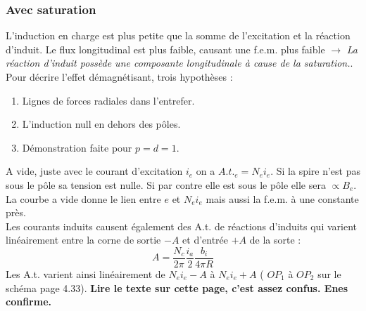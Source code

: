		\subsubsection{Avec saturation}
		L'induction en charge est plus petite que la somme de l'excitation 
		et la réaction d'induit. Le flux longitudinal est plus faible, 
		causant une f.e.m. plus faible $\rightarrow$\textit{ La réaction 
		d'induit possède une composante longitudinale à cause de la 
		saturation.}. Pour décrire l'effet démagnétisant, trois hypothèses :
		\begin{enumerate}
		\item Lignes de forces radiales dans l'entrefer.
		\item L'induction null en dehors des pôles.
		\item Démonstration faite pour $p=d=1$.
		\end{enumerate}
		A vide, juste avec le courant d'excitation $i_e$ on a $A.t._e = 
		N_ei_e$. Si la spire n'est pas sous le pôle sa tension est nulle. 
		Si par contre elle est sous le pôle elle sera $\propto B_e$. La 
		courbe a vide donne le lien entre $e$ et $N_ei_e$ mais aussi la 
		f.e.m. à une constante près.\\
		Les courants induits causent également des A.t. de réactions 
		d'induits qui varient linéairement entre la corne de sortie $-A$ 
		et d'entrée $+A$ de la sorte :
		\begin{equation}
		A = \frac{N_c}{2\pi}\frac{i_a}{2}\frac{b_i}{4\pi R}
		\end{equation}
		Les A.t. varient ainsi linéairement de $N_ei_e-A$ à $N_ei_e+A$ (
		$OP_1$ à $OP_2$ sur le schéma page 4.33). \textbf{Lire le texte 
		sur cette page, c'est assez confus. Enes confirme.}
		
